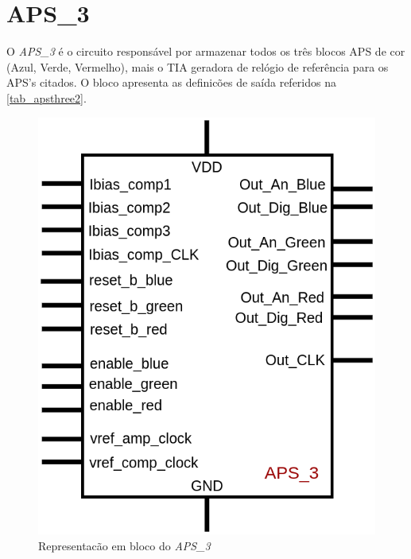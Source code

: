 \renewcommand{\NomeBloco}{\textit{APS\_3}}
\renewcommand{\NomeBlocoNoUnderline}{apsthree}
\renewcommand{\NomePTab}{tab_\NomeBlocoNoUnderline}
\renewcommand{\NomeSTab}{tab_\NomeBlocoNoUnderline2}
\renewcommand{\NomePFig}{fig_\NomeBlocoNoUnderline}
\renewcommand{\NomeSFig}{fig_\NomeBlocoNoUnderline2}
\renewcommand{\NomeTTab}{tab_\NomeBlocoNoUnderline3}
\renewcommand{\NomeQTab}{tab_\NomeBlocoNoUnderline4}

\section{APS\_3}

O \textit{\NomeBloco} \'e o circuito respons\'avel por armazenar todos os tr\^es blocos APS de cor (Azul, Verde, Vermelho), mais o TIA geradora de rel\'ogio de refer\^encia para os APS's citados. O bloco apresenta as definicões de sa\'ida referidos na \autoref{\NomeSTab}.

\begin{figure}[!h]
 \centering
    \centering
    \caption{\label{\NomeSFig}Representacão em bloco do \NomeBloco}
    \includegraphics[scale=0.3]{Circuitos/APS_3_block.png}
\end{figure}

